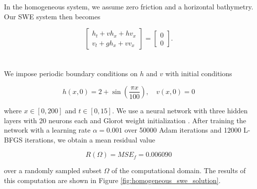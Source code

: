 In the homogeneous system, we assume zero friction and a horizontal bathymetry. Our SWE system then becomes

$$
\renewcommand*{\arraystretch}{1.5}\begin{bmatrix}
    
    h_t + v h_x + h v_x \\
    v_t + g h_x + v v_x
\end{bmatrix} = \begin{bmatrix}
    0 \\
    0
\end{bmatrix}.
$$
\ \\\\
\noindent We impose periodic boundary conditions on $h$ and $v$ with initial conditions

$$
h(x, 0) = 2 + \sin{\left( \frac{\pi x}{100} \right)}, \quad v(x, 0) = 0
$$

\noindent where $x \in [0, 200]$ and $t \in [0, 15]$. We use a neural network with three hidden layers with 20 neurons 
each and Glorot weight initialization \cite{glorot2010understanding}. After training the network with a learning rate
$\alpha = 0.001$ over 50000 Adam iterations and 12000 L-BFGS iterations, we obtain a mean residual value

$$
R(\Omega) = MSE_f = 0.006090
$$

\pagebreak

\noindent over a randomly sampled subset $\Omega$ of the computational domain. The results of this computation are shown 
in Figure \ref{fig:homogeneous_swe_solution}.


